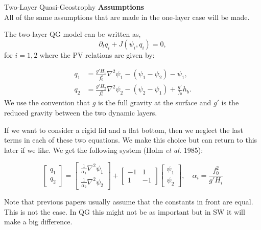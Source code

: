 \documentclass[12pt]{article}
\begin{document}
\newpage
\begin{section}{Two-Layer Quasi-Geostrophy}
    \textbf{Assumptions} \\
    All of the same assumptions that are made in the one-layer case will be made.

    The two-layer QG model can be written as,
    $$
    \partial_t q_i + J(\psi_i, q_i) = 0,
    $$
    for $i=1,2$ where the PV relations are given by:

    \begin{align*}
        q_1 &= \frac{g'H_1}{f_0^2}\nabla^2 \psi_1 - (\psi_1 - \psi_2) - \psi_1,\\
        q_2 &= \frac{g'H_2}{f_0^2}\nabla^2 \psi_2 - (\psi_2 - \psi_1) + \frac{g'}{f_0} h_b.
    \end{align*}
    We use the convention that $g$ is the full gravity at the surface and $g'$ is the reduced gravity between the two dynamic layers.

    If we want to consider a rigid lid and a flat bottom, then we neglect the last terms in each of these two equations.  We make this choice but can return to this later if we like. We get the following system (Holm \emph{et al.} 1985):

    \begin{equation}
        \left[\begin{array}{c}
        q_1 \\
        q_2
        \end{array}\right]
        =
        \left[\begin{array}{c}
        \frac{1}{\alpha_1}\nabla^2 \psi_1 \\
        \frac{1}{\alpha_2}\nabla^2 \psi_2
        \end{array}\right]
        +
        \left[\begin{array}{cc}
        -1 & 1 \\
        1 & -1
        \end{array}\right]
        \left[\begin{array}{c}
        \psi_1 \\
        \psi_2
        \end{array}\right],
        \quad \alpha_i = \frac{f_0^2}{g'H_i}
    \end{equation}

    Note that previous papers usually assume that the constants in front are equal. This is not the case.  In QG this might not be as important but in SW it will make a big difference.


\end{section}
\end{document}

